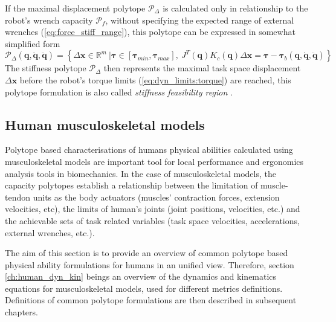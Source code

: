 If the maximal displacement polytope $\mathcal{P}_\Delta$ is calculated only in relationship to the robot's wrench capacity $\mathcal{P}_f$, without specifying the expected range of external wrenches (\ref{eq:force_stiff_range}), this polytope can be expressed in somewhat simplified form
\begin{equation}
    \mathcal{P}_\Delta(\bm{q},\dot{\bm{q}},\ddot{\bm{q}}) =\! \left\{ \Delta\bm{x} \in \mathbb{R}^m ~|\bm{\tau}\in\left[\bm{\tau}_{min}, \bm{\tau}_{max} \right]\!,\! ~ J^T(\bm{q})K_c(\bm{q})\Delta\bm{x}\!= \bm{\tau}\! -\! \bm{\tau}_b(\bm{q},\dot{\bm{q}},\ddot{\bm{q}}) \right\}
    \label{eq:pol_sfr_rob}
\end{equation}
The stiffness polytope $\mathcal{P}_\Delta$ then represents the maximal task space displacement $\Delta \bm{x}$ before the robot's torque limits (\ref{eq:dyn_limits:torque}) are reached, this polytope formulation is also called \textit{stiffness feasibility region} \cite{ajoudani2017choosing,ajoudani2015role}.

\subsection{Human musculoskeletal models}
\label{ch:human_metrics}
Polytope based characterisations of humans physical abilities calculated using musculoskeletal models are important tool for local performance and ergonomics analysis tools in biomechanics. In the case of musculoskeletal models, the capacity polytopes establish a relationship between the limitation of muscle-tendon units as the body actuators (muscles' contraction forces,  extension velocities, etc), the limits of human's joints (joint positions, velocities, etc.) and the achievable sets of task related variables (task space velocities, accelerations, external wrenches, etc.).

The aim of this section is to provide an overview of common polytope based physical ability formulations for humans in an unified view. Therefore, section \ref{ch:human_dyn_kin} beings an overview of the dynamics and kinematics equations for musculoskeletal models, used for different metrics definitions. Definitions of common polytope formulations are then described in subsequent chapters.

